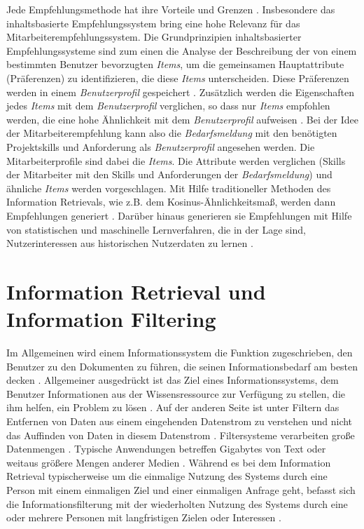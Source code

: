 Jede Empfehlungsmethode hat ihre Vorteile und Grenzen \cite{lu2020recommender}. Insbesondere das inhaltsbasierte Empfehlungssystem bring eine hohe Relevanz für das Mitarbeiterempfehlungssystem. Die Grundprinzipien inhaltsbasierter Empfehlungssysteme sind zum einen die Analyse der Beschreibung der von einem bestimmten Benutzer bevorzugten \emph{Items}, um die gemeinsamen Hauptattribute (Präferenzen) zu identifizieren, die diese \emph{Items} unterscheiden. Diese Präferenzen werden in einem \emph{Benutzerprofil} gespeichert \cite{lu2020recommender}. Zusätzlich werden die Eigenschaften jedes \emph{Items} mit dem \emph{Benutzerprofil} verglichen, so dass nur \emph{Items} empfohlen werden, die eine hohe Ähnlichkeit mit dem \emph{Benutzerprofil} aufweisen \cite{lu2020recommender}. Bei der Idee der Mitarbeiterempfehlung kann also die \emph{Bedarfsmeldung} mit den benötigten Projektskills und Anforderung als \emph{Benutzerprofil} angesehen werden. Die Mitarbeiterprofile sind dabei die \emph{Items}. Die Attribute werden verglichen (Skills der Mitarbeiter mit den Skills und Anforderungen der \emph{Bedarfsmeldung}) und ähnliche \emph{Items} werden vorgeschlagen. Mit Hilfe traditioneller Methoden des Information Retrievals, wie z.B. dem Kosinus-Ähnlichkeitsmaß, werden dann Empfehlungen generiert \cite{lu2020recommender}. Darüber hinaus generieren sie Empfehlungen mit Hilfe von statistischen und maschinelle Lernverfahren, die in der Lage sind, Nutzerinteressen aus historischen Nutzerdaten zu lernen \cite{lu2020recommender}.
\section{Information Retrieval und Information Filtering}
Im Allgemeinen wird einem Informationssystem die Funktion zugeschrieben, den Benutzer zu den Dokumenten zu führen, die seinen Informationsbedarf am besten decken \cite{belkin1992information}. Allgemeiner ausgedrückt ist das Ziel eines Informationssystems, dem Benutzer Informationen aus der Wissensressource zur Verfügung zu stellen, die ihm helfen, ein Problem zu lösen \cite{belkin1992information}. Auf der anderen Seite ist unter Filtern das Entfernen von Daten aus einem eingehenden Datenstrom zu verstehen und nicht das Auffinden von Daten in diesem Datenstrom \cite{belkin1992information}. Filtersysteme verarbeiten große Datenmengen \cite{belkin1992information}. Typische Anwendungen betreffen Gigabytes von Text oder weitaus größere Mengen anderer Medien \cite{belkin1992information}. Während es bei dem Information Retrieval typischerweise um die einmalige Nutzung des Systems durch eine Person mit einem einmaligen Ziel und einer einmaligen Anfrage geht, befasst sich die Informationsfilterung mit der wiederholten Nutzung des Systems durch eine oder mehrere Personen mit langfristigen Zielen oder Interessen \cite{belkin1992information}.
